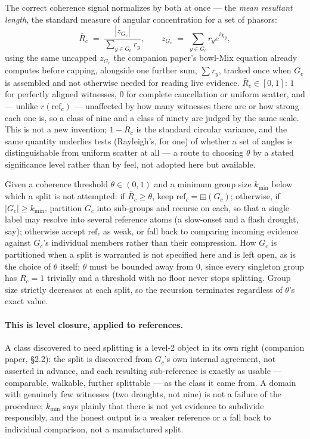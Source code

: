 \documentclass[12pt, a4paper]{article}
\begin{document}
The correct coherence signal normalizes by both at once --- the
\emph{mean resultant length}, the standard measure of angular
concentration for a set of phasors:
\begin{equation}
    \bar R_c \;=\; \frac{|z_{G_c}|}{\sum_{y\in G_c} r_y},
    \qquad
    z_{G_c} \;=\; \sum_{y\in G_c} r_y e^{i\chi_y},
    \label{eq:coherence}
\end{equation}
using the same uncapped $z_{G_c}$ the companion paper's bowl-Mix
equation already computes before capping, alongside one further sum,
$\sum r_y$, tracked once when $G_c$ is assembled and not otherwise
needed for reading live evidence. $\bar R_c\in[0,1]$: $1$ for
perfectly aligned witnesses, $0$ for complete cancellation or uniform
scatter, and --- unlike $r(\mathrm{ref}_c)$ --- unaffected by how many
witnesses there are or how strong each one is, so a class of nine and
a class of ninety are judged by the same scale. This is not a new
invention; $1-\bar R_c$ is the standard circular variance, and the
same quantity underlies tests (Rayleigh's, for one) of whether a set
of angles is distinguishable from uniform scatter at all --- a route
to choosing $\theta$ by a stated significance level rather than by
feel, not adopted here but available.

Given a coherence threshold $\theta\in(0,1)$ and a minimum
group size $k_{\min}$ below which a split is not attempted: if
$\bar R_c\ge\theta$, keep $\mathrm{ref}_c=\boxplus(G_c)$; otherwise, if
$|G_c|\ge k_{\min}$, partition $G_c$ into sub-groups and recurse on
each, so that a single label may resolve into several reference atoms
(a slow-onset and a flash drought, say); otherwise accept
$\mathrm{ref}_c$ as weak, or fall back to comparing incoming evidence
against $G_c$'s individual members rather than their compression. How
$G_c$ is partitioned when a split is warranted is not specified here
and is left open, as is the choice of $\theta$ itself; $\theta$ must
be bounded away from $0$, since every singleton group has $\bar
R_c=1$ trivially and a threshold with no floor never stops splitting.
Group size strictly decreases at each split, so the recursion
terminates regardless of $\theta$'s exact value.

\paragraph{This is level closure, applied to references.} A class
discovered to need splitting is a level-2 object in its own right
(companion paper, \S2.2): the split is discovered from $G_c$'s own
internal agreement, not asserted in advance, and each resulting
sub-reference is exactly as usable --- comparable, walkable, further
splittable --- as the class it came from. A domain with genuinely
few witnesses (two droughts, not nine) is not a failure of the
procedure; $k_{\min}$ says plainly that there is not yet evidence to
subdivide responsibly, and the honest output is a weaker reference or
a fall back to individual comparison, not a manufactured split.
\end{document}
